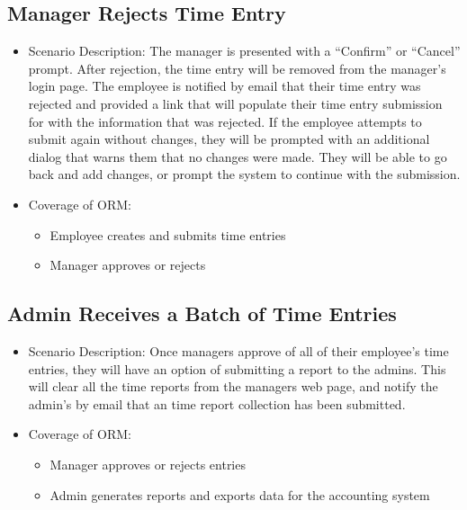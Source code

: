 \documentclass[12pt]{article}
\begin{document}
\subsection{ Manager Rejects Time Entry}
\begin{itemize}
\item Scenario Description: The manager is presented with a “Confirm” or “Cancel” prompt. After rejection, the time entry will be removed from the manager’s login page. The employee is notified by email that their time entry was rejected and provided a link that will populate their time entry submission for with the information that was rejected. If the employee attempts to submit again without changes, they will be prompted with an additional dialog that warns them that no changes were made. They will be able to go back and add changes, or prompt the system to continue with the submission.
\item Coverage of ORM:
\begin{itemize}
\item Employee creates and submits time entries
\item Manager approves or rejects
\end{itemize}
\end{itemize}

\subsection{ Admin Receives a Batch of Time Entries}
\begin{itemize}
\item Scenario Description:
Once managers approve of all of their employee’s time entries, they will have an option of submitting a report to the admins. This will clear all the time reports from the managers web page, and notify the admin’s by email that an time report collection has been submitted.
\item Coverage of ORM:
\begin{itemize}
\item Manager approves or rejects entries\\
\item Admin generates reports and exports data for the accounting system
\end{itemize}
\end{itemize}
\end{document}
